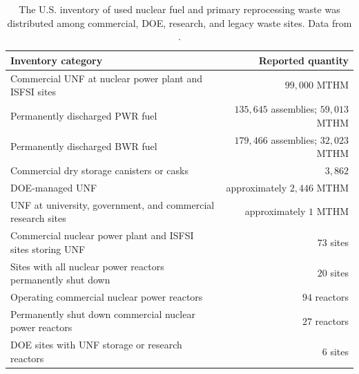 \begin{table}[htbp]
    \centering
    \caption{The U.S. inventory of used nuclear fuel and primary
    reprocessing waste was distributed among commercial, \gls{DOE}, research, and
    legacy waste sites. Data from
    \cite{carter_banerjee_inventory_2024,GC-859}.}
    \label{tab:us-unf-summary}

    \begin{threeparttable}
    \begin{tabularx}{\textwidth}{@{}Xr@{}}
        \toprule
        \textbf{Inventory category} & \textbf{Reported quantity} \\
        \midrule
        Commercial \gls{UNF} at nuclear power plant and \gls{ISFSI} sites
            & \(99{,}000\) \gls{MTHM} \\

        Permanently discharged \gls{PWR} fuel
            & \(135{,}645\) assemblies; \(59{,}013\) \gls{MTHM} \\

        Permanently discharged \gls{BWR} fuel
            & \(179{,}466\) assemblies; \(32{,}023\) \gls{MTHM} \\

        Commercial dry storage canisters or casks
            & \(3{,}862\) \\

        \gls{DOE}-managed \gls{UNF}
            & approximately \(2{,}446\) \gls{MTHM}\tnote{a} \\

        \gls{UNF} at university, government, and commercial research sites
            & approximately \(1\) \gls{MTHM} \\

        Commercial nuclear power plant and \gls{ISFSI} sites storing \gls{UNF}
            & \(73\) sites \\

        Sites with all nuclear power reactors permanently shut down
            & \(20\) sites \\

        Operating commercial nuclear power reactors
            & \(94\) reactors \\

        Permanently shut down commercial nuclear power reactors
            & \(27\) reactors \\

        \gls{DOE} sites with \gls{UNF} storage or research reactors
            & \(6\) sites \\


\end{tabularx}
\end{threeparttable}
\end{table}
